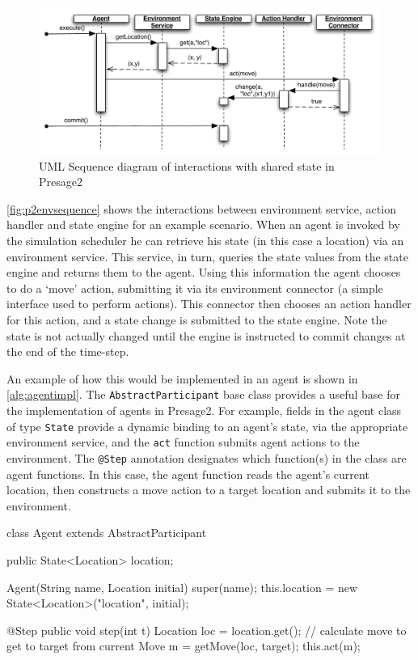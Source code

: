 \begin{figure}
\caption{UML Sequence diagram of interactions with shared state in Presage2}\label{fig:p2envsequence}
\includegraphics[width=\linewidth]{gfx/presage2/environment_sequence}
\end{figure}

\autoref{fig:p2envsequence} shows the interactions between environment
service, action handler and state engine for an example scenario. When an
agent is invoked by the simulation scheduler he can retrieve his state (in
this case a location) via an environment service. This service, in turn,
queries the state values from the state engine and returns them to the agent.
Using this information the agent chooses to do a `move' action, submitting it
via its environment connector (a simple interface used to perform actions).
This connector then chooses an action handler for this action, and a state
change is submitted to the state engine. Note the state is not actually
changed until the engine is instructed to commit changes at the end of the
time-step.

An example of how this would be implemented in an agent is shown in
\autoref{alg:agentimpl}. The \texttt{AbstractParticipant} base class provides
a useful base for the implementation of agents in Presage2. For example,
fields in the agent class of type \texttt{State} provide a dynamic binding to
an agent's state, via the appropriate environment service, and the
\texttt{act} function submits agent actions to the environment. The
\texttt{@Step} annotation designates which function(s) in the class are agent
functions. In this case, the agent function reads the agent's current
location, then constructs a move action to a target location and submits it to
the environment.

\begin{java}[caption={Presage2 agent implementation},label=alg:agentimpl]
class Agent extends AbstractParticipant {
	public State<Location> location;

	Agent(String name, Location initial) {
		super(name);
		this.location = new State<Location>("location", initial);
	}

	@Step
	public void step(int t) {
		Location loc = location.get();
		// calculate move to get to target from current
		Move m = getMove(loc, target);
		this.act(m);
	}
}
\end{java}

